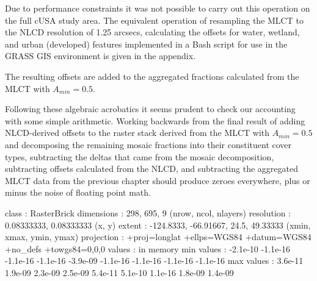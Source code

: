 

Due to performance constraints it was not possible to carry out this
operation on the full cUSA study area.  The equivalent operation of
resampling the MLCT to the NLCD resolution of 1.25 arcsecs,
calculating the offsets for water, wetland, and urban (developed)
features implemented in a Bash script for use in the GRASS GIS
environment is given in the appendix.



The resulting offsets are added to the aggregated fractions calculated
from the MLCT with $A_{min}=0.5$.  








Following these algebraic acrobatics it seems prudent to check our
accounting with some simple arithmetic.  Working backwards from the
final result of adding NLCD-derived offsets to the raster stack
derived from the MLCT with $A_{min}=0.5$ and decomposing the remaining
mosaic fractions into their constituent cover types, subtracting the
deltas that came from the mosaic decomposition, subtracting offsets
calculated from the NLCD, and subtracting the aggregated MLCT data
from the previous chapter 
should produce zeroes everywhere, plus or minus the noise of floating
point math.




\begin{Schunk}
\begin{Soutput}
class       : RasterBrick 
dimensions  : 298, 695, 9  (nrow, ncol, nlayers)
resolution  : 0.08333333, 0.08333333  (x, y)
extent      : -124.8333, -66.91667, 24.5, 49.33333  (xmin, xmax, ymin, ymax)
projection  : +proj=longlat +ellps=WGS84 +datum=WGS84 +no_defs +towgs84=0,0,0 
values      : in memory
min values  : -2.1e-10 -1.1e-16 -1.1e-16 -1.1e-16 -3.9e-09 -1.1e-16 -1.1e-16 -1.1e-16 -1.1e-16 
max values  : 3.6e-11 1.9e-09 2.3e-09 2.5e-09 5.4e-11 5.1e-10 1.1e-16 1.8e-09 1.4e-09 
\end{Soutput}
\end{Schunk}

